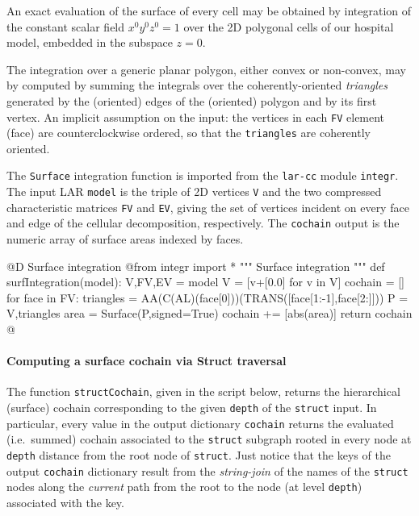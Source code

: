 \documentclass[11pt,oneside]{article}    %
\begin{document}
An exact evaluation of the surface of every cell may be obtained by integration of the constant scalar field $x^0y^0z^0 = 1$ over the 2D polygonal cells of our hospital model, embedded in the subspace $z=0$. 

The integration over a generic planar polygon, either convex or non-convex, may by computed by summing the integrals over the coherently-oriented \emph{triangles} generated by the (oriented) edges of the (oriented) polygon and by its first vertex. An implicit assumption on the input: the vertices in each \texttt{FV} element (face) are counterclockwise ordered, so that the \texttt{triangles} are coherently oriented.

The \texttt{Surface} integration function is imported from the \texttt{lar-cc} module \texttt{integr}. The input LAR \texttt{model} is the triple of 2D vertices \texttt{V} and the two compressed characteristic matrices \texttt{FV} and \texttt{EV}, giving the set of vertices incident on every face and edge of the cellular decomposition, respectively. The \texttt{cochain} output is the numeric array of surface areas indexed by faces. 

@D Surface integration
@{from integr import *
""" Surface integration """
def surfIntegration(model):
    V,FV,EV = model
    V = [v+[0.0] for v in V]
    cochain = []
    for face in FV:
        triangles = AA(C(AL)(face[0]))(TRANS([face[1:-1],face[2:]]))
        P = V,triangles
        area = Surface(P,signed=True) 
        cochain += [abs(area)]
    return cochain
@}


\paragraph{Computing a surface cochain via Struct traversal}

The function \texttt{structCochain}, given in the script below, returns the hierarchical (surface) cochain corresponding to the given \texttt{depth} of the \texttt{struct} input. In particular, every value in the output dictionary \texttt{cochain} returns the evaluated (i.e.~summed) cochain associated to the \texttt{struct} subgraph rooted in every node at  \texttt{depth} distance from the root node of \texttt{struct}. Just notice that the keys of the output \texttt{cochain} dictionary result from the \emph{string-join} of the names of the \texttt{struct} nodes along the \emph{current} path from the root to the node (at level \texttt{depth}) associated with the key.
\end{document}
